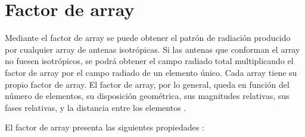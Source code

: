 \section{Factor de array}
\label{FA}
\par Mediante el factor de array se puede obtener el patrón de radiación producido por cualquier array de antenas isotrópicas. Si las antenas que conforman el array no fuesen isotrópicos, se podrá obtener el campo radiado total multiplicando el factor de array por el campo radiado de un elemento único. Cada array tiene su propio factor de array. El factor de array, por lo general, queda en función del número de elementos, su disposición geométrica, sus magnitudes relativas, sus fases relativas, y la distancia entre los elementos \cite{Balanis2015}. 
\\
\par El factor de array presenta las siguientes propiedades \cite{Cardama2002}:

